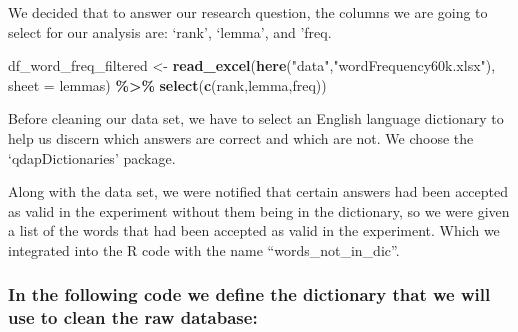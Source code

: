 \documentclass[
]{article}
\newenvironment{Shaded}{\begin{snugshade}}{\end{snugshade}}
\newcommand{\AttributeTok}[1]{\textcolor[rgb]{0.13,0.29,0.53}{#1}}
\newcommand{\FunctionTok}[1]{\textcolor[rgb]{0.13,0.29,0.53}{\textbf{#1}}}
\newcommand{\NormalTok}[1]{#1}
\newcommand{\OtherTok}[1]{\textcolor[rgb]{0.56,0.35,0.01}{#1}}
\newcommand{\SpecialCharTok}[1]{\textcolor[rgb]{0.81,0.36,0.00}{\textbf{#1}}}
\newcommand{\StringTok}[1]{\textcolor[rgb]{0.31,0.60,0.02}{#1}}
\begin{document}
We decided that to answer our research question, the columns we are
going to select for our analysis are: `rank', `lemma', and 'freq.

\begin{Shaded}
\begin{Highlighting}[]
\NormalTok{df\_word\_freq\_filtered }\OtherTok{\textless{}{-}} \FunctionTok{read\_excel}\NormalTok{(}\FunctionTok{here}\NormalTok{(}\StringTok{"data"}\NormalTok{,}\StringTok{"wordFrequency60k.xlsx"}\NormalTok{), }
                           \AttributeTok{sheet =} \StringTok{\textquotesingle{}lemmas\textquotesingle{}}\NormalTok{)  }\SpecialCharTok{\%\textgreater{}\%} 
  \FunctionTok{select}\NormalTok{(}\FunctionTok{c}\NormalTok{(}\StringTok{\textquotesingle{}rank\textquotesingle{}}\NormalTok{,}\StringTok{\textquotesingle{}lemma\textquotesingle{}}\NormalTok{,}\StringTok{\textquotesingle{}freq\textquotesingle{}}\NormalTok{))}
\end{Highlighting}
\end{Shaded}

Before cleaning our data set, we have to select an English language
dictionary to help us discern which answers are correct and which are
not. We choose the `qdapDictionaries' package.

Along with the data set, we were notified that certain answers had been
accepted as valid in the experiment without them being in the
dictionary, so we were given a list of the words that had been accepted
as valid in the experiment. Which we integrated into the R code with the
name ``words\_not\_in\_dic''.

\hypertarget{in-the-following-code-we-define-the-dictionary-that-we-will-use-to-clean-the-raw-database}{%
\subsubsection{In the following code we define the dictionary that we
will use to clean the raw
database:}\label{in-the-following-code-we-define-the-dictionary-that-we-will-use-to-clean-the-raw-database}}
\end{document}
